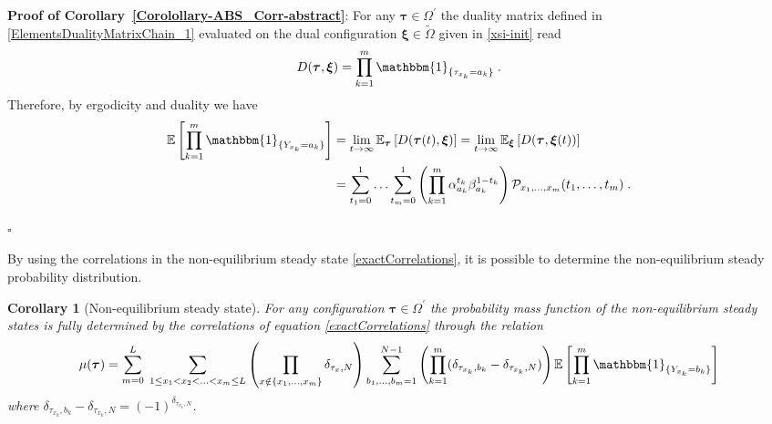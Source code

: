 \documentclass[10pt]{article}
\numberwithin{equation}{section}
\numberwithin{equation}{subsection}
\newtheorem{corollary}{Corollary}
\newcommand{\dt}{\;.}
\begin{document}
\textbf{Proof of Corollary~\ref{Corolollary-ABS_Corr-abstract}}:
For any $\bm{\tau}\in \Omega^{'}$ the duality matrix defined in \eqref{ElementsDualityMatrixChain_1} evaluated on the dual configuration $\bm{\xi}\in\widetilde{\Omega}$ given in \eqref{xsi-init} read
\begin{equation}
	D(\bm{\tau},\bm{\xi})%
	=\prod_{k=1}^{m}\mathbbm{1}_{\{\tau_{x_{k}}=a_{k}\}}\dt
\end{equation}
Therefore, by ergodicity and duality  we have 
\begin{equation}\label{CorrelationByABS-prob}
	\begin{split}
\mathbb{E}\left[\prod_{k=1}^{m}\mathbbm{1}_{\{Y_{x_{k}}=a_{k}\}}\right]&=\lim_{t\to \infty}\mathbb{E}_{\bm{\tau}}\left[D(\bm{\tau}(t),\bm{{\xi}})\right]=\lim_{t\to \infty}\mathbb{E}_{\bm{\xi}}\left[D(\bm{\tau},\bm{{\xi}}(t))\right]
	\\&=\sum_{t_{1}=0}^{1}\ldots \sum_{t_{m}=0}^{1}\left(\prod_{k=1}^{m}\alpha_{a_{k}}^{t_{k}}\beta_{a_{k}}^{1-t_{k}}\right)\mathcal{P}_{x_{1},\ldots,x_{m}}(t_{1},\ldots,t_{m})\dt
\end{split}
\end{equation} 
\begin{flushright}
	$\square$
\end{flushright} 
{By using the correlations in the non-equilibrium steady state \eqref{exactCorrelations}, it is possible to determine the non-equilibrium steady probability distribution. }
    \begin{corollary}[Non-equilibrium steady state]\label{Corollary-NESS-ABS}
For any configuration $\bm{\tau}\in \Omega^{'}$  the probability mass function of the non-equilibrium steady states is fully determined by the correlations of equation \eqref{exactCorrelations} through the relation 
{\color{blue}
\begin{equation}\label{implicit-mass-function}
	\mu(\bm{\tau})=
	\sum_{m=0}^{L}\;\sum_{1\leq x_{1}<x_{2}<\ldots<x_{m}\leq L}\left(\prod_{x\notin\{x_{1},\ldots,x_{m}\}}\delta_{\tau_{x},N}\right)\sum_{b_{1},\ldots,b_{m}=1}^{N-1}\left(\prod_{k=1}^{m}(\delta_{\tau_{x_{k}},b_{k}}-\delta_{\tau_{x_{k}},N})\right)\mathbb{E}\left[\prod_{k=1}^{m}\mathbbm{1}_{\{Y_{x_{k}}=b_{k}\}}\right]
\end{equation}
where $\delta_{\tau_{x_{k}},b_{k}}-\delta_{\tau_{x_{k}},N}=(-1)^{\delta_{\tau_{x_{k}},N}}$.
}
\end{corollary}
\end{document}

